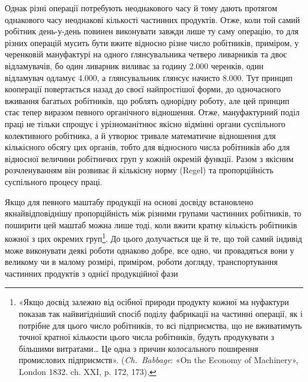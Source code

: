 Однак різні операції потребують неоднакового часу й тому
дають протягом однакового часу неоднакові кількості частинних
продуктів. Отже, коли той самий робітник день-у-день повинен
виконувати завжди лише ту саму операцію, то для різних
операцій мусить бути вжите відносно різне число робітників,
приміром, у черенковій мануфактурі на одного ґлянсувальника
четверо ливарників та двоє відламувачів, бо один ливарник виливає
за годину \num{2.000} черенків, один відламувач одламує \num{4.000}, а
ґлянсувальник ґлянсує начисто \num{8.000}. Тут принцип кооперації
повертається назад до своєї найпростішої форми, до одночасного
вживання багатьох робітників, що роблять однорідну роботу,
але цей принцип стає тепер виразом певного органічного відношення.
Отже, мануфактурний поділ праці не тільки спрощує
і урізноманітнює якісно відмінні органи суспільного колективного
робітника, а й утворює тривале математичне відношення
для кількісного обсягу цих органів, тобто для відносного числа
робітників або для відносної величини робітничих груп у кожній
окремій функції. Разом з якісним розчленуванням він розвиває
й кількісну норму (Regel) та пропорційність суспільного процесу
праці.

Якщо для певного маштабу продукції на основі досвіду встановлено
якнайвідповіднішу пропорційність між різними групами
частинних робітників, то поширити цей маштаб можна лише тоді,
коли вжити кратну кількість робітників кожної з цих окремих
груп\footnote{
«Якщо досвід залежно від осібної природи продукту кожної ма
нуфактури показав так найвигідніший спосіб поділу фабрикації на
частинні операції, як і потрібне для цього число робітників, то всі підприємства,
що не вживатимуть точної кратної кількости цього числа
робітників, будуть продукувати з більшими витратами\dots{} Це одна з
причин колосального поширення промислових підприємств». (\emph{Ch.~Babbage}:
«On the Economy of Machinery», London 1832. ch. XXI, p. 172, 173).
}. До цього долучається ще й те, що той самий індивід може
виконувати деякі роботи однаково добре, все одно, чи провадяться
вони у великому чи в малому розмірі, приміром, роботи догляду,
транспортування частинних продуктів з однієї продукційної фази
\parbreak{}  %
